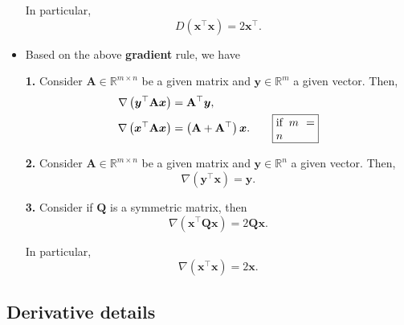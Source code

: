 \documentclass[12pt,thmsa]{article}
\begin{document}
\begin{itemize}
	In particular,
	\[
	D\left(\boldsymbol{x}^{\top} \boldsymbol{x}\right)=2 \boldsymbol{x}^{\top}.
	\]

	\item Based on the above \textbf{gradient} rule, we have

	\textbf{1.} Consider \(\mathbf{A} \in \mathbb{R}^{m \times n}\) be a given matrix and \(\boldsymbol{y} \in \mathbb{R}^{m}\) a given vector. Then,
	\begin{align*}
		\nabla \left(\boldsymbol{y}^{\top} \mathbf{A} \boldsymbol{x}\right) &= \mathbf{A}^{\top} \boldsymbol{y}, \\
		\nabla  \left(\boldsymbol{x}^{\top} \mathbf{A} \boldsymbol{x}\right) &=
		\left(\mathbf{A}+\mathbf{A}^{\top}\right) \boldsymbol{x}.  \qquad
		\fbox{\parbox{0.1\textwidth}{ if \(m=n\) }}
	\end{align*}
	
	
	\textbf{2.} Consider \(\mathbf{A} \in \mathbb{R}^{m \times n}\) be a given matrix and \(\boldsymbol{y} \in \mathbb{R}^{n}\) a given vector. Then,
	\[ \nabla \left(\boldsymbol{y}^{\top} \boldsymbol{x}\right)=\boldsymbol{y}. \]
	
	\textbf{3.} Consider if \(\mathbf{Q}\) is a symmetric matrix, then
	\[
	\nabla \left(\boldsymbol{x}^{\top} \mathbf{Q} \boldsymbol{x}\right)=2  \mathbf{Q} \boldsymbol{x}.
	\]
	
	In particular,
	\[
	\nabla \left(\boldsymbol{x}^{\top} \boldsymbol{x}\right)=2 \boldsymbol{x}.
	\]

\end{itemize}


\subsection{Derivative details}
\end{document}
